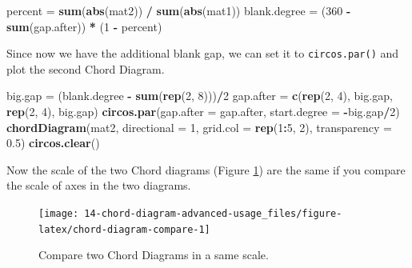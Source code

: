 \documentclass[]{book}
\newenvironment{Shaded}{\begin{snugshade}}{\end{snugshade}}
\newcommand{\KeywordTok}[1]{\textcolor[rgb]{0.13,0.29,0.53}{\textbf{#1}}}
\newcommand{\DataTypeTok}[1]{\textcolor[rgb]{0.13,0.29,0.53}{#1}}
\newcommand{\DecValTok}[1]{\textcolor[rgb]{0.00,0.00,0.81}{#1}}
\newcommand{\FloatTok}[1]{\textcolor[rgb]{0.00,0.00,0.81}{#1}}
\newcommand{\StringTok}[1]{\textcolor[rgb]{0.31,0.60,0.02}{#1}}
\newcommand{\OperatorTok}[1]{\textcolor[rgb]{0.81,0.36,0.00}{\textbf{#1}}}
\newcommand{\NormalTok}[1]{#1}
\theoremstyle{definition}
\theoremstyle{definition}
\theoremstyle{remark}
\begin{document}
\begin{Shaded}
\begin{Highlighting}[]
\NormalTok{percent =}\StringTok{ }\KeywordTok{sum}\NormalTok{(}\KeywordTok{abs}\NormalTok{(mat2)) }\OperatorTok{/}\StringTok{ }\KeywordTok{sum}\NormalTok{(}\KeywordTok{abs}\NormalTok{(mat1))}
\NormalTok{blank.degree =}\StringTok{ }\NormalTok{(}\DecValTok{360} \OperatorTok{-}\StringTok{ }\KeywordTok{sum}\NormalTok{(gap.after)) }\OperatorTok{*}\StringTok{ }\NormalTok{(}\DecValTok{1} \OperatorTok{-}\StringTok{ }\NormalTok{percent)}
\end{Highlighting}
\end{Shaded}

Since now we have the additional blank gap, we can set it to
\texttt{circos.par()} and plot the second Chord Diagram.

\begin{Shaded}
\begin{Highlighting}[]
\NormalTok{big.gap =}\StringTok{ }\NormalTok{(blank.degree }\OperatorTok{-}\StringTok{ }\KeywordTok{sum}\NormalTok{(}\KeywordTok{rep}\NormalTok{(}\DecValTok{2}\NormalTok{, }\DecValTok{8}\NormalTok{)))}\OperatorTok{/}\DecValTok{2}
\NormalTok{gap.after =}\StringTok{ }\KeywordTok{c}\NormalTok{(}\KeywordTok{rep}\NormalTok{(}\DecValTok{2}\NormalTok{, }\DecValTok{4}\NormalTok{), big.gap, }\KeywordTok{rep}\NormalTok{(}\DecValTok{2}\NormalTok{, }\DecValTok{4}\NormalTok{), big.gap)}
\KeywordTok{circos.par}\NormalTok{(}\DataTypeTok{gap.after =}\NormalTok{ gap.after, }\DataTypeTok{start.degree =} \OperatorTok{-}\NormalTok{big.gap}\OperatorTok{/}\DecValTok{2}\NormalTok{)}
\KeywordTok{chordDiagram}\NormalTok{(mat2, }\DataTypeTok{directional =} \DecValTok{1}\NormalTok{, }\DataTypeTok{grid.col =} \KeywordTok{rep}\NormalTok{(}\DecValTok{1}\OperatorTok{:}\DecValTok{5}\NormalTok{, }\DecValTok{2}\NormalTok{), }\DataTypeTok{transparency =} \FloatTok{0.5}\NormalTok{)}
\KeywordTok{circos.clear}\NormalTok{()}
\end{Highlighting}
\end{Shaded}

Now the scale of the two Chord diagrams (Figure
\ref{fig:chord-diagram-compare}) are the same if you compare the scale
of axes in the two diagrams.

\begin{figure}

{\centering \texttt{[image: 14-chord-diagram-advanced-usage\_files/figure-latex/chord-diagram-compare-1]} 

}

\caption{Compare two Chord Diagrams in a same scale.}\label{fig:chord-diagram-compare}
\end{figure}
\end{document}
